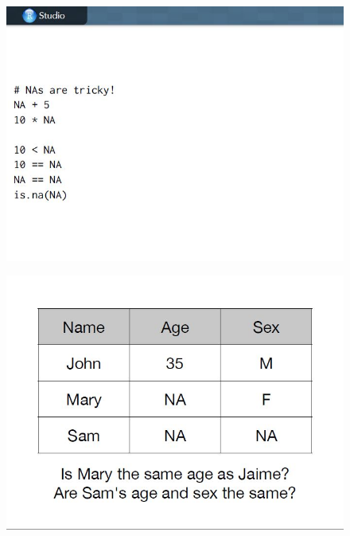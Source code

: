 \documentclass{beamer}
\begin{document}
\begin{frame}
	\begin{figure}
		\centering
		\includegraphics[width=1.05\linewidth]{images/CG-dplyr2}
	\end{figure}
\end{frame}
\begin{frame}
	\begin{figure}
		\centering
		\includegraphics[width=1.05\linewidth]{images/CG-dplyr3}
	\end{figure}
\end{frame}
\end{document}
